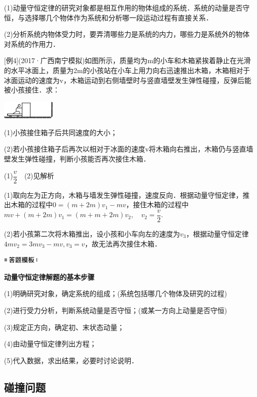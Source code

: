 \documentclass[cn,10.5pt,chinese,mac,chinesefont=founder]{elegantbook}
\begin{document}
(1)动量守恒定律的研究对象都是相互作用的物体组成的系统．系统的动量是否守恒，与选择哪几个物体作为系统和分析哪一段运动过程有直接关系．

(2)分析系统内物体受力时，要弄清哪些力是系统的内力，哪些力是系统外的物体对系统的作用力．

{[}例4{]}(2017·广西南宁模拟)如图所示，质量均为m的小车和木箱紧挨着静止在光滑的水平冰面上，质量为2m的小孩站在小车上用力向右迅速推出木箱，木箱相对于冰面运动的速度为v，木箱运动到右侧墙壁时与竖直墙壁发生弹性碰撞，反弹后能被小孩接住．求：

\begin{center}\includegraphics[width=1.01875in,height=0.34931in]{media/image251.png}\end{center}

(1)小孩接住箱子后共同速度的大小；

(2)若小孩接住箱子后再次以相对于冰面的速度v将木箱向右推出，木箱仍与竖直墙壁发生弹性碰撞，判断小孩能否再次接住木箱．
\begin{solution}
	(1)$\dfrac{v}{2}$　(2)见解析
	
	(1)取向左为正方向，木箱与墙发生弹性碰撞，速度反向．根据动量守恒定律，推出木箱的过程中$0=(m+2 m) v_{1}-mv$，接住木箱的过程中$m v+(m+2 m) v_{1}=(m+m+2 m) v_{2}, \quad v_{2}=\dfrac{v}{2}$.

(2)若小孩第二次将木箱推出，设小孩和小车向左的速度为$v_3$，根据动量守恒定律$4 m v_{2}=3 m v_{3}-m v, v_{3}=v$，故无法再次接住木箱．
\end{solution}


\begin{center}\includegraphics[width=0.70764in,height=0.12292in]{media/image25.png}

\textbf{动量守恒定律解题的基本步骤}
\end{center}


(1)明确研究对象，确定系统的组成；(系统包括哪几个物体及研究的过程)

(2)进行受力分析，判断系统动量是否守恒；(或某一方向上动量是否守恒)

(3)规定正方向，确定初、末状态动量；

(4)由动量守恒定律列出方程；

(5)代入数据，求出结果，必要时讨论说明．
\newpage
\subsection{碰撞问题}
\end{document}
